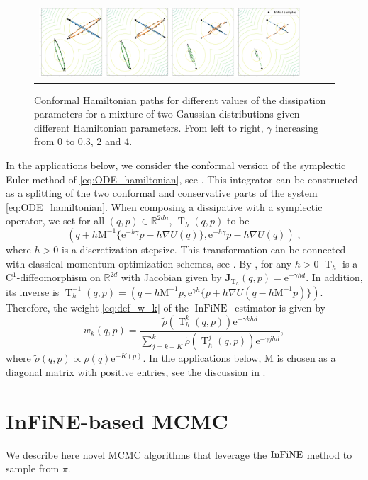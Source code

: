 \documentclass{article}
\def\mass{\mathrm{M}}
\def\IFIS{\ensuremath{\operatorname{InFiNE}}}
\def\InFiNE{{\small \IFIS}}
\def\transfo{\operatorname{T}}
\def\rset{\mathbb{R}}
\def\eqsp{\,}
\def\eqsp{\;}
\newcommand{\1}{\mathds{1}}
\def\Jac{\mathbf{J}}
\newcommand{\JacOp}[1]{\Jac_{#1}}
\def\rset{\mathbb{R}}
\def\rme{\mathrm{e}}
\def\rmC{\mathrm{C}}
\begin{document}
 \begin{figure}[h!]
     \centering
\begin{tabular}{cccc}
     \includegraphics[width=1\linewidth]{bigplot.pdf}
\end{tabular}
     \caption{Conformal Hamiltonian paths for different values of the dissipation parameters for a mixture of two Gaussian distributions given different Hamiltonian parameters. From left to right, $\gamma$ increasing from 0 to 0.3, 2 and 4.}
     \label{fig:toy_example_posterior}
 \end{figure}
In the applications below, we consider the conformal version of the symplectic Euler method of \eqref{eq:ODE_hamiltonian}, see \cite{francca2019conformal}.
This integrator can be constructed as a splitting of the two conformal and conservative parts of the system \eqref{eq:ODE_hamiltonian}. When composing a dissipative with a  symplectic operator, we set for all $(q,p) \in \rset^{2dn}$, $\transfo_h(q,p)$ to be
 \[
 (q+h\mass^{-1}\{ \rme^{-h\gamma} p -h \nabla U(q)\},
 \rme^{-h \gamma } p -h \nabla U(q))\eqsp,
\]
where $h >0$ is a discretization stepsize.
This transformation can be connected with classical momentum optimization schemes, see \cite[Section 4]{francca2019conformal}.
By \cite[Section 3]{francca2019conformal}, for any $h >0$ $\transfo_h$ is a $\rmC^1$-diffeomorphism on $\rset^{2d}$ with Jacobian given by $\JacOp{\transfo_h}(q,p) = \rme^{-\gamma h d}$. In addition,  its inverse is
$  \transfo_h^{
-1}(q,p) = (q-h\mass^{-1} p,\rme^{\gamma h}\{p+h \nabla U(q-h\mass^{-1} p)\})$.
Therefore, the weight \eqref{eq:def_w_k} of the  \IFIS\  estimator is given by
\begin{equation}
w_{k}(q,p) = \frac{ \tilde \rho(\transfo^k_h(q,p)) \rme^{-\gamma k h d} }{
    \sum_{j = k-K}^k  \tilde \rho(\transfo^j_h(q,p)) \rme^{-\gamma j h d} },
\end{equation}
where $\tilde \rho(q,p) \propto \rho(q) \rme^{-K(p)}$.
In the applications below, $\mass$ is chosen as a diagonal matrix with positive entries, see the  discussion  in .

\section{InFiNE-based MCMC}\label{sec:infine:MCMC}
We describe here novel MCMC algorithms that leverage the $\InFiNE$ method to sample from $\pi$.
\end{document}
